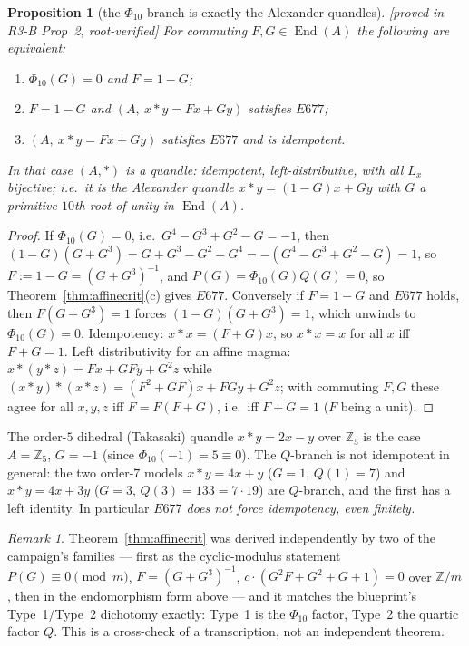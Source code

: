 \documentclass[11pt]{article}
\theoremstyle{plain}
\newtheorem{proposition}[theorem]{Proposition}
\theoremstyle{definition}
\theoremstyle{remark}
\newtheorem*{remark*}{Remark}
\numberwithin{equation}{section}
\newcommand{\Z}{\mathbb{Z}}
\newcommand{\op}{\mathbin{*}}
\newcommand{\End}{\operatorname{End}}
\newcommand{\statusbox}[1]{{\small\sloppy\textsf{[#1]}}}
\newcommand{\PROVED}[1]{\statusbox{proved in #1, root-verified}}
\begin{document}
\begin{proposition}[the $\Phi_{10}$ branch is exactly the Alexander quandles]\label{prop:quandle}
\PROVED{R3-B Prop~2}
For commuting $F,G\in\End(A)$ the following are equivalent:
\begin{enumerate}
\item $\Phi_{10}(G) = 0$ and $F = 1-G$;
\item $F = 1-G$ and $(A,\ x\op y = Fx+Gy)$ satisfies $E677$;
\item $(A,\ x\op y = Fx+Gy)$ satisfies $E677$ and is \emph{idempotent}.
\end{enumerate}
In that case $(A,\op)$ is a \emph{quandle}: idempotent, left-distributive, with all $L_x$
bijective; i.e.\ it is the Alexander quandle $x\op y = (1-G)x+Gy$ with $G$ a primitive $10$th
root of unity in $\End(A)$.
\end{proposition}

\begin{proof}
If $\Phi_{10}(G)=0$, i.e.\ $G^4-G^3+G^2-G = -1$, then
$(1-G)(G+G^3) = G+G^3-G^2-G^4 = -(G^4-G^3+G^2-G) = 1$, so $F := 1-G = (G+G^3)^{-1}$, and
$P(G) = \Phi_{10}(G)Q(G) = 0$, so Theorem~\ref{thm:affinecrit}(c) gives $E677$. Conversely if
$F=1-G$ and $E677$ holds, then $F(G+G^3)=1$ forces $(1-G)(G+G^3)=1$, which unwinds to
$\Phi_{10}(G)=0$. Idempotency: $x\op x = (F+G)x$, so $x\op x = x$ for all $x$ iff $F+G=1$.
Left distributivity for an affine magma: $x\op(y\op z) = Fx+GFy+G^2z$ while
$(x\op y)\op(x\op z) = (F^2+GF)x + FGy + G^2z$; with commuting $F,G$ these agree for all
$x,y,z$ iff $F = F(F+G)$, i.e.\ iff $F+G=1$ ($F$ being a unit).
\end{proof}

The order-$5$ dihedral (Takasaki) quandle $x\op y = 2x-y$ over $\Z_5$ is the case $A=\Z_5$,
$G=-1$ (since $\Phi_{10}(-1)=5\equiv 0$). The $Q$-branch is not idempotent in general: the
two order-$7$ models $x\op y = 4x+y$ ($G=1$, $Q(1)=7$) and $x\op y = 4x+3y$ ($G=3$,
$Q(3)=133=7\cdot 19$) are $Q$-branch, and the first has a left identity. In particular
\emph{$E677$ does not force idempotency, even finitely.}

\begin{remark*}
Theorem~\ref{thm:affinecrit} was derived independently by two of the campaign's families ---
first as the cyclic-modulus statement $P(G)\equiv 0 \pmod m$, $F = (G+G^3)^{-1}$,
$c\cdot(G^2F+G^2+G+1)=0$ over $\Z/m$ \cite{F5}, then in the endomorphism form above
\cite{R3B} --- and it matches the blueprint's Type~1/Type~2 dichotomy exactly: Type~1 is the
$\Phi_{10}$ factor, Type~2 the quartic factor $Q$. This is a cross-check of a transcription,
not an independent theorem.
\end{remark*}
\end{document}
